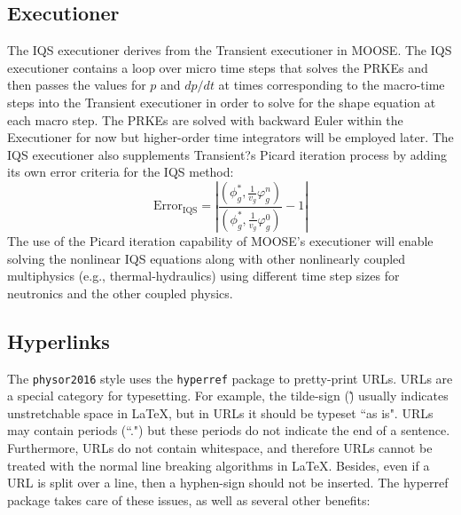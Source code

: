 \documentclass[12pt]{article}
\newcommand{\be}{\begin{equation}}
\newcommand{\ee}{\end{equation}}
\begin{document}
\subsection{Executioner}

The IQS executioner derives from the Transient executioner in MOOSE.  The IQS executioner contains a loop over micro time steps that solves the PRKEs and then passes the values for $p$ and $dp/dt$ at times corresponding to the macro-time steps into the Transient executioner in order to solve for the shape equation at each macro step.  The PRKEs are solved with backward Euler within the Executioner for now but higher-order time integrators will be employed later.  The IQS executioner also supplements Transient?s Picard iteration process by adding its own error criteria for the IQS method: 
\be
\text{Error}_{\text{IQS}}=\left|\frac{\left(\phi^*_g,\frac{1}{v_g}\varphi_g^n\right)}{\left(\phi_g^*,\frac{1}{v_g}\varphi_g^0\right)}-1\right|
\ee
The use of the Picard iteration capability of MOOSE's executioner will enable solving the nonlinear IQS equations along with other nonlinearly coupled multiphysics (e.g., thermal-hydraulics) using different time step sizes for neutronics and the other coupled physics. 

%
\subsection{Hyperlinks} 
\label{subsect::hyper}

The \texttt{physor2016} style uses the \texttt{hyperref} package to pretty-print URLs. URLs are a special category for typesetting. For example, the tilde-sign (\~) usually indicates unstretchable space in LaTeX, but in URLs it should be typeset ``as is". URLs may contain periods (``.") but these periods do not indicate the end of a sentence. Furthermore, URLs do not contain whitespace, and therefore URLs cannot be treated with the normal line breaking algorithms in \LaTeX. Besides, even if a URL is split over a line, then a hyphen-sign should not be inserted. The hyperref package takes care of these issues, as well as several other benefits:
\end{document}
